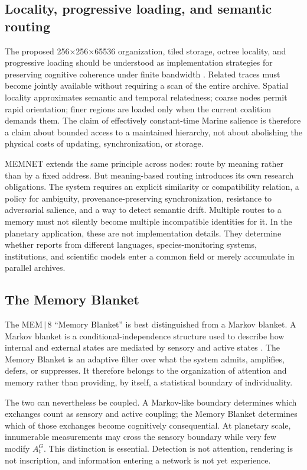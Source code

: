 \documentclass[11pt]{article}
\begin{document}
\subsection{Locality, progressive loading, and semantic routing}

The proposed 256$\times$256$\times$65536 organization, tiled storage, octree locality, and progressive loading should be understood as implementation strategies for preserving cognitive coherence under finite bandwidth \cite{flyxionMem8Design,flyxionAdaptive}. Related traces must become jointly available without requiring a scan of the entire archive. Spatial locality approximates semantic and temporal relatedness; coarse nodes permit rapid orientation; finer regions are loaded only when the current coalition demands them. The claim of effectively constant-time Marine salience is therefore a claim about bounded access to a maintained hierarchy, not about abolishing the physical costs of updating, synchronization, or storage.

MEMNET extends the same principle across nodes: route by meaning rather than by a fixed address. But meaning-based routing introduces its own research obligations. The system requires an explicit similarity or compatibility relation, a policy for ambiguity, provenance-preserving synchronization, resistance to adversarial salience, and a way to detect semantic drift. Multiple routes to a memory must not silently become multiple incompatible identities for it. In the planetary application, these are not implementation details. They determine whether reports from different languages, species-monitoring systems, institutions, and scientific models enter a common field or merely accumulate in parallel archives.

\subsection{The Memory Blanket}
\label{sec:memory-blanket}

The MEM\,$|$\,8 ``Memory Blanket'' is best distinguished from a Markov blanket. A Markov blanket is a conditional-independence structure used to describe how internal and external states are mediated by sensory and active states \cite{kirchhoff2018}. The Memory Blanket is an adaptive filter over what the system admits, amplifies, defers, or suppresses. It therefore belongs to the organization of attention and memory rather than providing, by itself, a statistical boundary of individuality.

The two can nevertheless be coupled. A Markov-like boundary determines which exchanges count as sensory and active coupling; the Memory Blanket determines which of those exchanges become cognitively consequential. At planetary scale, innumerable measurements may cross the sensory boundary while very few modify $A_t^G$. This distinction is essential. Detection is not attention, rendering is not inscription, and information entering a network is not yet experience.
\end{document}
